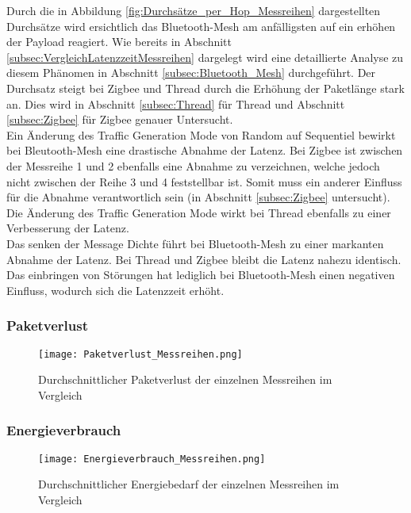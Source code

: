 Durch die in Abbildung \ref{fig:Durchsätze_per_Hop_Messreihen} dargestellten Durchsätze wird ersichtlich das Bluetooth-Mesh am anfälligsten auf ein erhöhen der Payload reagiert. Wie bereits in Abschnitt \ref{subsec:VergleichLatenzzeitMessreihen} dargelegt wird eine detaillierte Analyse zu diesem Phänomen in Abschnitt \ref{subsec:Bluetooth_Mesh} durchgeführt. Der Durchsatz steigt bei Zigbee und Thread durch die Erhöhung der Paketlänge stark an. Dies wird in Abschnitt \ref{subsec:Thread} für Thread und Abschnitt \ref{subsec:Zigbee} für Zigbee genauer Untersucht. \\

Ein Änderung des Traffic Generation Mode von Random auf Sequentiel bewirkt bei Bleutooth-Mesh eine drastische Abnahme der Latenz. Bei Zigbee ist zwischen der Messreihe 1 und 2 ebenfalls eine Abnahme zu verzeichnen, welche jedoch nicht zwischen der Reihe 3 und 4 feststellbar ist. Somit muss ein anderer Einfluss für die Abnahme verantwortlich sein (in Abschnitt \ref{subsec:Zigbee} untersucht). Die Änderung des Traffic Generation Mode wirkt bei Thread ebenfalls zu einer Verbesserung der Latenz.\\

Das senken der Message Dichte führt bei Bluetooth-Mesh zu einer markanten Abnahme der Latenz. Bei Thread und Zigbee bleibt die Latenz nahezu identisch. \\

Das einbringen von Störungen hat lediglich bei Bluetooth-Mesh einen negativen Einfluss, wodurch sich die Latenzzeit erhöht. 

\subsubsection{Paketverlust}\label{subsec:VergleichPaketverlustMessreihen}


\begin{figure}[H]
	\centering
	\texttt{[image: Paketverlust\_Messreihen.png]}
	\caption{Durchschnittlicher Paketverlust der einzelnen Messreihen im Vergleich}\label{fig:PaketverlusteMessreihen}
\end{figure}

\subsubsection{Energieverbrauch}\label{subsec:VergleichEnergieverbrauchMessreihen}


\begin{figure}[H]
	\centering
	\texttt{[image: Energieverbrauch\_Messreihen.png]}
	\caption{Durchschnittlicher Energiebedarf der einzelnen Messreihen im Vergleich}\label{fig:PaketverlusteMessreihen}
\end{figure}



